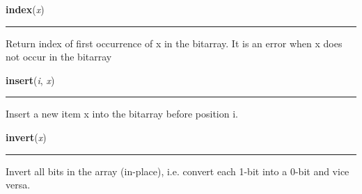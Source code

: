     \label{bitarray:_bitarray:index}

    \vspace{0.5ex}

    \begin{boxedminipage}{\textwidth}

    \raggedright \textbf{index}(\textit{x})

    \vspace{-1.5ex}

    \rule{\textwidth}{0.5\fboxrule}

Return index of first occurrence of x in the bitarray.
It is an error when x does not occur in the bitarray
    \vspace{1ex}

    \end{boxedminipage}

    \label{bitarray:_bitarray:insert}

    \vspace{0.5ex}

    \begin{boxedminipage}{\textwidth}

    \raggedright \textbf{insert}(\textit{i}, \textit{x})

    \vspace{-1.5ex}

    \rule{\textwidth}{0.5\fboxrule}

Insert a new item x into the bitarray before position i.
    \vspace{1ex}

    \end{boxedminipage}

    \label{bitarray:_bitarray:invert}

    \vspace{0.5ex}

    \begin{boxedminipage}{\textwidth}

    \raggedright \textbf{invert}(\textit{x})

    \vspace{-1.5ex}

    \rule{\textwidth}{0.5\fboxrule}

Invert all bits in the array (in-place),
i.e. convert each 1-bit into a 0-bit and vice versa.
    \vspace{1ex}

    \end{boxedminipage}


